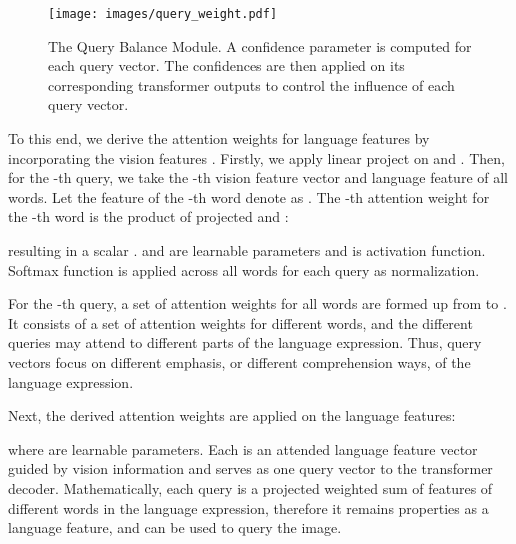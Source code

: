 \documentclass[10pt,twocolumn,letterpaper]{article}
\begin{document}
\begin{figure*}[t]
   \begin{center}
      \texttt{[image: images/query\_weight.pdf]}
   \end{center}
    \vspace{-0.1in}
   \caption{The Query Balance Module. A confidence parameter is computed for each query vector. The confidences are then applied on its corresponding transformer outputs to control the influence of each query vector.}
   \label{fig:query_weight}
   \vspace{-0.1in}
\end{figure*}

To this end, we derive the attention weights for language features  by incorporating the vision features . Firstly, we apply linear project on  and . Then, for the -th query, we take the -th vision feature vector  and language feature of all words. Let the feature of the -th word denote as . The -th attention weight for the -th word is the product of projected  and :

resulting in a scalar .  and  are learnable parameters and  is activation function. Softmax function is applied across all words for each query as normalization.

For the -th query, a set of attention weights for all words are formed up from  to . It consists of a set of attention weights for different words, and the different queries may attend to different parts of the language expression. Thus,  query vectors focus on different emphasis, or different comprehension ways, of the language expression. 

Next, the derived attention weights are applied on the language features:

where  are learnable parameters. Each  is an attended language feature vector guided by vision information and serves as one query vector to the transformer decoder. Mathematically, each query is a projected weighted sum of features of different words in the language expression, therefore it remains properties as a language feature, and can be used to query the image.

\begin{table*}[t]
   \centering
   \small
   \caption{Comparison with Convolutional Networks in terms of parameter size and performance. The ``\#params'' represents the number of trainable parameters in our Transformer and its substitute, a module with seven 33 convolutional layers.}
   \vspace{-0.05in}
   \label{tab:param}\end{table*}
\end{document}
